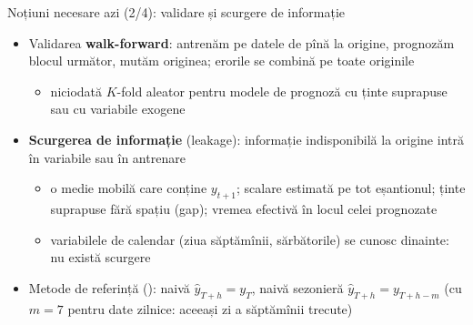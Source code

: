 \begin{frame}{Noțiuni necesare azi (2/4): validare și scurgere de informație}
\itemsize{\small}
\begin{itemize}
    \item Validarea \textbf{walk-forward}: antrenăm pe datele de pînă la origine, prognozăm blocul următor, mutăm originea; erorile se combină pe toate originile
    \begin{itemize}
        \item niciodată $K$-fold aleator pentru modele de prognoză cu ținte suprapuse sau cu variabile exogene
    \end{itemize}
    \item \textbf{Scurgerea de informație} (leakage): informație indisponibilă la origine intră în variabile sau în antrenare
    \begin{itemize}
        \item o medie mobilă care conține $y_{t+1}$; scalare estimată pe tot eșantionul; ținte suprapuse fără spațiu (gap); vremea efectivă în locul celei prognozate
        \item variabilele de calendar (ziua săptămînii, sărbătorile) se cunosc dinainte: nu există scurgere
    \end{itemize}
    \item Metode de referință (): naivă $\hat y_{T+h} = y_T$, naivă sezonieră $\hat y_{T+h} = y_{T+h-m}$ (cu $m = 7$ pentru date zilnice: aceeași zi a săptămînii trecute)
\end{itemize}
\end{frame}

